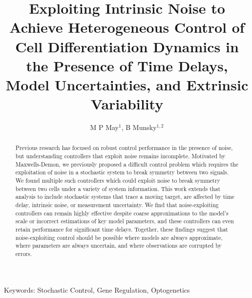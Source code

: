 \documentclass[12pt]{iopart}
\begin{document}
\def\brian[#1]{{\color{red} #1 }}
\def\michael[#1]{{\color{green} #1 }}

\title[Heterogeneous Control of Cell Differentiation Dynamics]{Exploiting Intrinsic Noise to Achieve Heterogeneous Control of Cell Differentiation Dynamics in the Presence of Time Delays, Model Uncertainties, and Extrinsic Variability}
\maketitle

\author{M P May$^1$, B Munsky$^{1,2}$}

\address{$^1$ School of Bioengineering, Colorado State University, Fort Collins, CO, USA}
\address{$^2$ Department of Chemical and Biological Engineering, Colorado State University, Fort Collins, CO, USA}

\begin{abstract}
Previous research has focused on robust control performance in the presence of noise, but understanding controllers that exploit noise remains incomplete. 
Motivated by Maxwells-Demon, we previously proposed a difficult control problem which requires the exploitation of noise in a stochastic system to break symmetry between two signals. We found multiple such controllers which could exploit noise to break symmetry between two cells under a variety of system information.
This work extends that analysis to include stochastic systems that trace a moving target, are affected by time delay, intrinsic noise, or measurement uncertainty.
 We find that noise-exploiting controllers can remain highly effective despite coarse approximations to the model's scale or incorrect estimations of key model parameters, and these controllers can even retain performance for significant time delays.  Together, these findings suggest that noise-exploiting control should be possible where models are always approximate, where parameters are always uncertain, and where observations are corrupted by errors.


\end{abstract}
Keywords: Stochastic Control, Gene Regulation, Optogenetics

%
%
%
\maketitle
% 
\end{document}
